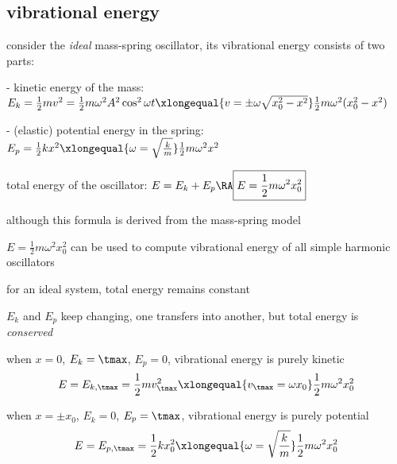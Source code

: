 

\subsection{vibrational energy}

consider the \emph{ideal} mass-spring oscillator, its vibrational energy consists of two parts:

\begin{compactitem}
	\item[-] kinetic energy of the mass: $E_k = \frac{1}{2} mv^2 = \frac{1}{2} m \omega^2 A^2 \cos^2\omega t \xlongequal{v=\pm\omega\sqrt{x_0^2-x^2}} \frac{1}{2}m\omega^2 (x_0^2-x^2)$
	
	\item[-] (elastic) potential energy in the spring: $E_p = \frac{1}{2} kx^2  \xlongequal{\omega = \sqrt{\frac{k}{m}}} \frac{1}{2}m\omega^2 x^2$
\end{compactitem}

total energy of the oscillator: $E = E_k + E_p \RA \boxed{E = \frac{1}{2}m\omega^2x_0^2}$

\cmt although this formula is derived from the mass-spring model

$E = \frac{1}{2}m\omega^2x_0^2$ can be used to compute vibrational energy of all simple harmonic oscillators

\cmt for an ideal system, total energy remains constant

$E_k$ and $E_p$ keep changing, one transfers into another, but total energy is \emph{conserved}

\cmt when $x=0$, $E_k = \tmax$, $E_p=0$, vibrational energy is purely kinetic
\begin{equation*}
	E=E_{k,\tmax}=\frac{1}{2}mv_\tmax^2 \xlongequal{v_\tmax = \omega x_0} \frac{1}{2}m\omega^2x_0^2
\end{equation*}

\cmt when $x=\pm x_0$, $E_k = 0$, $E_p=\tmax$, vibrational energy is purely potential
\begin{equation*}
	E=E_{p,\tmax}=\frac{1}{2}kx_0^2 \xlongequal{\omega=\sqrt{\frac{k}{m}}} \frac{1}{2}m\omega^2x_0^2
\end{equation*}

